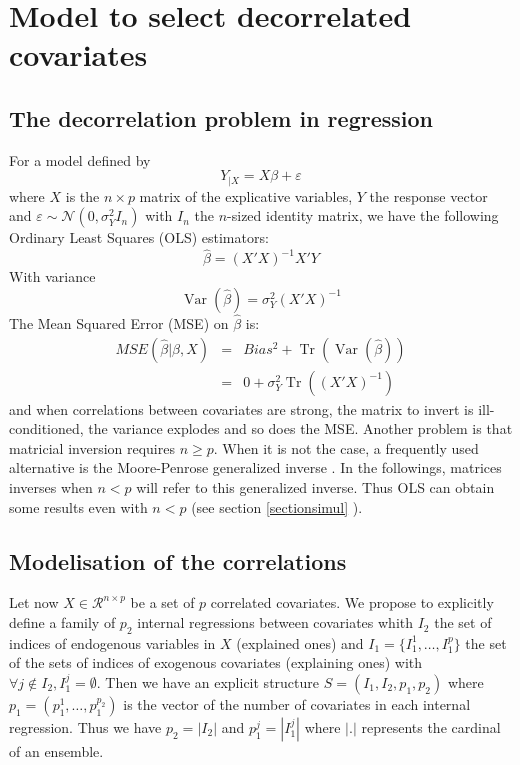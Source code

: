 \documentclass[11pt,a4paper]{article}
\begin{document}
\section{Model to select decorrelated covariates}
\subsection{The decorrelation problem in regression}
For a model defined by 
	\begin{equation}
		Y_{|X}=X\beta + \varepsilon
	\end{equation}
	where $X$ is the $n\times p$ matrix of the explicative variables, $Y$ the response vector and $\varepsilon \sim \mathcal{N}(0,\sigma_Y^2I_n)$ with $I_n$ the $n$-sized identity matrix,
	we have the following Ordinary Least Squares (OLS) estimators:
	\begin{equation}
		\hat{\beta}=\left(X'X \right) ^{-1}X'Y
	\end{equation}
	With variance 
	\begin{equation}
		\operatorname{Var}(\hat{\beta})=\sigma_Y^2(X'X)^{-1} \label{eqOLS}
	\end{equation}
	 The Mean Squared Error (MSE) on $\hat{\beta}$ is:
	\begin{eqnarray}
		MSE(\hat{\beta}|\beta,X)&=&Bias^2+\operatorname{Tr}(\operatorname{Var}(\hat{\beta})) \\
			&=&0+\sigma_Y^2 \operatorname{Tr}((X'X)^{-1})
	\end{eqnarray}	 
	and when correlations between covariates are strong, the matrix to invert is ill-conditioned, the variance explodes and so does the MSE.
	Another problem is that matricial inversion requires $n\geq p$. When it is not the case, a frequently used alternative is the Moore-Penrose generalized inverse \cite{katsikis2008fast}. In the followings, matrices inverses when $n<p$ will refer to this generalized inverse. Thus OLS can obtain some results even with $n<p$ (see section \ref{sectionsimul} ).
\subsection{Modelisation of the correlations}
Let now $X \in \mathcal{R}^{n\times p}$ be a set of $p$ correlated covariates.
We propose to explicitly define a family of $p_2$ internal regressions between covariates whith $I_2$ the set of indices of endogenous variables in $X$ (explained ones) and $I_1=\{I_1^1,\dots,I_1^p \}$ the set of the sets of indices of exogenous covariates (explaining ones) with $\forall j \notin I_2, I_1^j=\emptyset$. Then we have an explicit structure $S=(I_1,I_2,p_1,p_2)$ where $p_1=(p_1^1,\dots,p_1^{p_2})$ is the vector of the number of covariates in each internal regression. Thus we have $p_2=| I_2|$ and $p_1^j=|I_1^j|$ where $|.|$ represents the cardinal of an ensemble.
\end{document}
